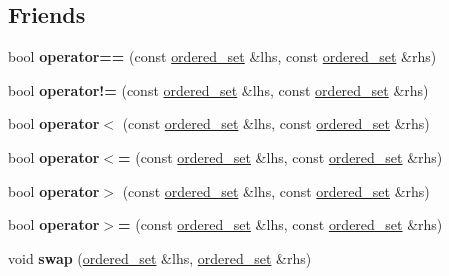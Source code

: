 \subsection*{Friends}
\begin{DoxyCompactItemize}
\item 
\mbox{\label{classtsl_1_1ordered__set_aa58b43c0c001cea18c9b7d7714b9d85c}} 
bool {\bfseries operator==} (const \mbox{\hyperlink{classtsl_1_1ordered__set}{ordered\+\_\+set}} \&lhs, const \mbox{\hyperlink{classtsl_1_1ordered__set}{ordered\+\_\+set}} \&rhs)
\item 
\mbox{\label{classtsl_1_1ordered__set_aafca13b71af5e35082b3e22c01680844}} 
bool {\bfseries operator!=} (const \mbox{\hyperlink{classtsl_1_1ordered__set}{ordered\+\_\+set}} \&lhs, const \mbox{\hyperlink{classtsl_1_1ordered__set}{ordered\+\_\+set}} \&rhs)
\item 
\mbox{\label{classtsl_1_1ordered__set_ad685a66cbb7c59a0923ca7d57a734c27}} 
bool {\bfseries operator$<$} (const \mbox{\hyperlink{classtsl_1_1ordered__set}{ordered\+\_\+set}} \&lhs, const \mbox{\hyperlink{classtsl_1_1ordered__set}{ordered\+\_\+set}} \&rhs)
\item 
\mbox{\label{classtsl_1_1ordered__set_a506164f732a96dfefef194dd47c5459d}} 
bool {\bfseries operator$<$=} (const \mbox{\hyperlink{classtsl_1_1ordered__set}{ordered\+\_\+set}} \&lhs, const \mbox{\hyperlink{classtsl_1_1ordered__set}{ordered\+\_\+set}} \&rhs)
\item 
\mbox{\label{classtsl_1_1ordered__set_a59796ffdc4400bdcb82073c952cdf451}} 
bool {\bfseries operator$>$} (const \mbox{\hyperlink{classtsl_1_1ordered__set}{ordered\+\_\+set}} \&lhs, const \mbox{\hyperlink{classtsl_1_1ordered__set}{ordered\+\_\+set}} \&rhs)
\item 
\mbox{\label{classtsl_1_1ordered__set_a94a17aeb7a1827b4f3cc26552ddb9db0}} 
bool {\bfseries operator$>$=} (const \mbox{\hyperlink{classtsl_1_1ordered__set}{ordered\+\_\+set}} \&lhs, const \mbox{\hyperlink{classtsl_1_1ordered__set}{ordered\+\_\+set}} \&rhs)
\item 
\mbox{\label{classtsl_1_1ordered__set_a5fb2c2dd5207da0a8b606fc11fa6dba8}} 
void {\bfseries swap} (\mbox{\hyperlink{classtsl_1_1ordered__set}{ordered\+\_\+set}} \&lhs, \mbox{\hyperlink{classtsl_1_1ordered__set}{ordered\+\_\+set}} \&rhs)
\end{DoxyCompactItemize}



